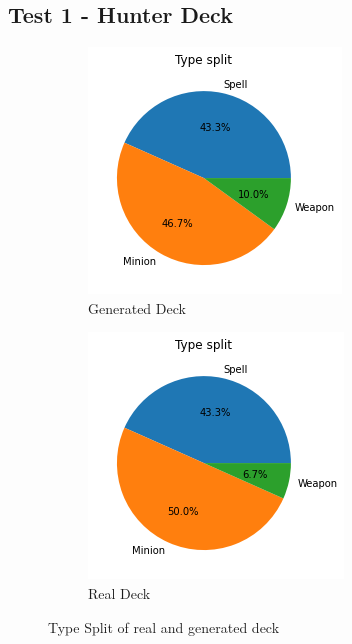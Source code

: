 \documentclass{report} %
\begin{document}
\subsection{Test 1 - Hunter Deck}
\begin{figure}[H]
\centering
\begin{subfigure}{.5\textwidth}
 \centering
 \includegraphics[width=.75\linewidth]{TestImages/HunterDeckSplitFake}
 \caption{Generated Deck}
\end{subfigure}%
\begin{subfigure}{.5\textwidth}
 \centering
 \includegraphics[width=.75\linewidth]{TestImages/HunterDeckSplitReal}
 \caption{Real Deck}
\end{subfigure}
\caption{Type Split of real and generated deck}
\end{figure}
\end{document}
